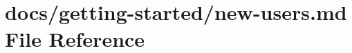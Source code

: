 \hypertarget{new-users_8md}{}\section{docs/getting-\/started/new-\/users.md File Reference}
\label{new-users_8md}
